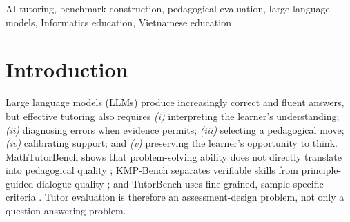 \documentclass[conference]{IEEEtran}
\newcommand{\benchmarkname}{VEduTutorBench}
\begin{document}
\begin{abstract}
Evaluating a large language model as a tutor requires interpreting the
learner's state, selecting an appropriate pedagogical move, and providing
calibrated support, not merely checking answer correctness. We present
\benchmarkname, a Vietnamese Grades~6-9 Informatics AI-tutor benchmark built
through a traceable pipeline from 1,050 teacher-authored dialogues. The
pipeline audits the dialogues, establishes six pedagogical principles and six
tutor capabilities, and converts eligible tutor turns into 2,028
context-conditioned candidates from 665 retained dialogue families. A
grounded LLM scores the necessity of all six principles for each candidate; deterministic checks
retain 1,400 candidates across 665 dialogue families. Our evaluation framework
preserves native multi-turn roles and compares tutor generated and teacher-authored
responses using four common criteria, three criteria per required principle,
and criterion-level Win/Tie/Lose judgments. We evaluate three tutor
configurations-two Gemini-based tutors and Llama~4~Maverick-whose responses
are independently assessed by two LLM judges. Together, the construction pipeline and evaluation framework provide
a curriculum-grounded protocol for Vietnamese Informatics AI tutoring.
\end{abstract}

\begin{IEEEkeywords}
AI tutoring, benchmark construction, pedagogical evaluation, large
language models, Informatics education, Vietnamese education
\end{IEEEkeywords}

\section{Introduction}

Large language models (LLMs) produce increasingly correct and fluent
answers, but effective tutoring also requires \textit{(i)} interpreting the
learner's understanding; \textit{(ii)} diagnosing errors when evidence
permits; \textit{(iii)} selecting a pedagogical move; \textit{(iv)}
calibrating support; and \textit{(v)} preserving the learner's opportunity to
think. MathTutorBench shows that problem-solving ability does not directly
translate into pedagogical quality \cite{macina2025mathtutorbench}; KMP-Bench
separates verifiable skills from principle-guided dialogue quality
\cite{shi2026kmpbench}; and TutorBench uses fine-grained, sample-specific
criteria \cite{srinivasa2025tutorbench}. Tutor evaluation is therefore an
assessment-design problem, not only a question-answering problem.
\end{document}
